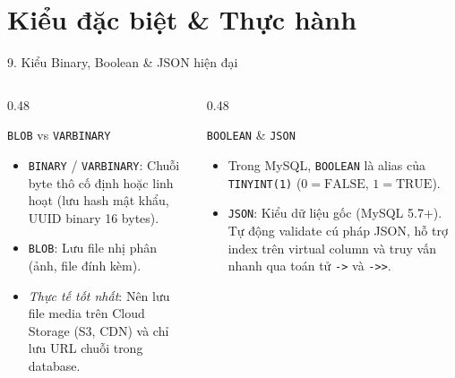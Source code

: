 \documentclass[aspectratio=169,11pt]{beamer}
\begin{document}
\section{Kiểu đặc biệt \& Thực hành}
\begin{frame}{9. Kiểu Binary, Boolean \& JSON hiện đại}
\begin{columns}[t]
  \begin{column}{0.48\textwidth}
    \begin{block}{\texttt{BLOB} vs \texttt{VARBINARY}}
      \begin{itemize}\setlength{\itemsep}{1.5pt}
        \item \texttt{BINARY} / \texttt{VARBINARY}: Chuỗi byte thô cố định hoặc linh hoạt (lưu hash mật khẩu, UUID binary 16 bytes).
        \item \texttt{BLOB}: Lưu file nhị phân (ảnh, file đính kèm).
        \item \textit{Thực tế tốt nhất}: Nên lưu file media trên Cloud Storage (S3, CDN) và chỉ lưu URL chuỗi trong database.
      \end{itemize}
    \end{block}
  \end{column}
  \begin{column}{0.48\textwidth}
    \begin{block}{\texttt{BOOLEAN} \& \texttt{JSON}}
      \begin{itemize}\setlength{\itemsep}{1.5pt}
        \item Trong MySQL, \texttt{BOOLEAN} là alias của \texttt{TINYINT(1)} ($0 = \text{FALSE}$, $1 = \text{TRUE}$).
        \item \texttt{JSON}: Kiểu dữ liệu gốc (MySQL 5.7+). Tự động validate cú pháp JSON, hỗ trợ index trên virtual column và truy vấn nhanh qua toán tử \texttt{->} và \texttt{->>}.
      \end{itemize}
    \end{block}
  \end{column}
\end{columns}
\end{frame}
\end{document}
